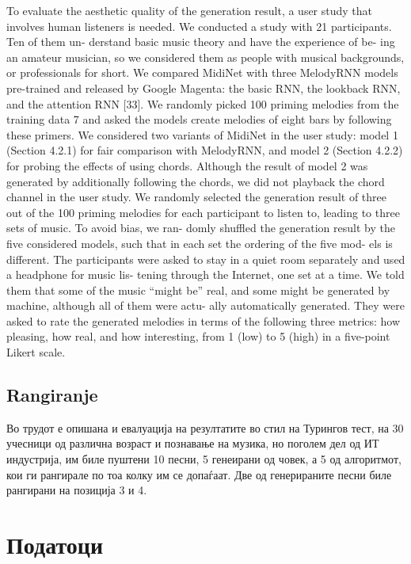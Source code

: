 \cite{MidiNet} To evaluate the aesthetic quality of the generation result, a user study that involves human listeners is needed. We conducted a study with 21 participants. Ten of them un- derstand basic music theory and have the experience of be- ing an amateur musician, so we considered them as people with musical backgrounds, or professionals for short. We compared MidiNet with three MelodyRNN models pre-trained and released by Google Magenta: the basic RNN, the lookback RNN, and the attention RNN [33]. We randomly picked 100 priming melodies from the training data 7 and asked the models create melodies of eight bars by following these primers. We considered two variants of MidiNet in the user study: model 1 (Section 4.2.1) for fair comparison with MelodyRNN, and model 2 (Section 4.2.2) for probing the effects of using chords. Although the result of model 2 was generated by additionally following the chords, we did not playback the chord channel in the user study. We randomly selected the generation result of three out of the 100 priming melodies for each participant to listen to, leading to three sets of music. To avoid bias, we ran- domly shuffled the generation result by the five considered models, such that in each set the ordering of the five mod- els is different. The participants were asked to stay in a quiet room separately and used a headphone for music lis- tening through the Internet, one set at a time. We told them that some of the music “might be” real, and some might be generated by machine, although all of them were actu- ally automatically generated. They were asked to rate the generated melodies in terms of the following three metrics: how pleasing, how real, and how interesting, from 1 (low) to 5 (high) in a five-point Likert scale.

\section{Rangiranje}

\cite{GarciaSalas2011}

 \cite{GarciaSalas2011} Во трудот е опишана и евалуација на резултатите во стил на Турингов тест, на 30 учесници од различна возраст и познавање на музика, но поголем дел од ИТ индустрија, им биле пуштени 10 песни, 5 генеирани од човек, а 5 од алгоритмот, кои ги рангирале по тоа колку им се допаѓаат. Две од генерираните песни биле рангирани на позиција 3 и 4. 


\chapter{Податоци}

